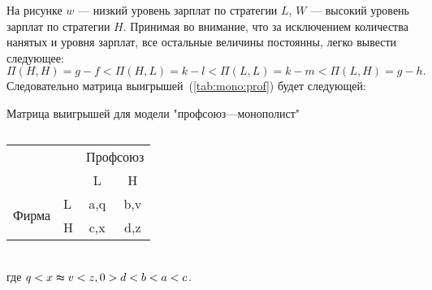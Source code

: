 На рисунке $w$ --- низкий уровень зарплат по стратегии $L$, $W$ --- высокий уровень зарплат по стратегии $H$. 
Принимая во внимание, что за исключением количества нанятых и уровня зарплат, все остальные величины постоянны,
легко вывести следующее:
\begin{equation}
\Pi(H,H)=g-f < \Pi(H,L)=k-l < \Pi(L, L)=k-m < \Pi(L,H)=g-h.
\end{equation}
Следовательно матрица выигрышей~(\ref{tab:mono:prof}) будет следующей:
\begin{table}[h]
	
	\centering
	\caption{}
		\footnotesize Матрица выигрышей для модели "профсоюз---монополист"\\
		\normalsize

\begin{tabular}{|l|l|c|c|}
	\hline
	\multicolumn{2}{|l|}{\multirow{2}{*}{}} & \multicolumn{2}{l|}{Профсоюз} \\ \cline{3-4} 
	\multicolumn{2}{|l|}{}                  & L                & H                \\ \hline
	\multirow{2}{*}{Фирма}    & L   & a,q              & b,v              \\ \cline{2-4} 
	& H   & c,x              & d,z              \\ \hline
\end{tabular}
	\label{table:firm}
\end{table}\\
где $q < x \thickapprox v < z, 0 > d < b < a < c$.
